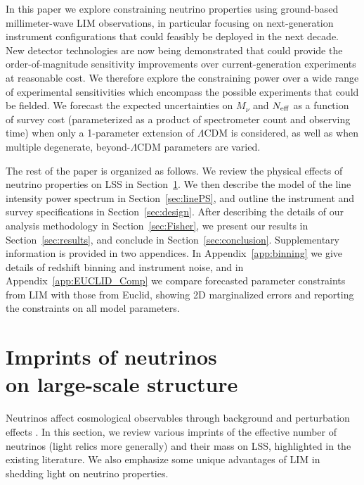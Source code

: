 \documentclass[twocolumn]{aastex631}
\begin{document}
In this paper we explore constraining neutrino properties using ground-based millimeter-wave LIM observations, in particular focusing on next-generation instrument configurations that could feasibly be deployed in the next decade.  New detector technologies are now being demonstrated that could provide the order-of-magnitude sensitivity improvements over current-generation experiments at reasonable cost.  We therefore explore the constraining power over a wide range of experimental sensitivities which encompass the possible experiments that could be fielded.  We forecast the expected uncertainties on $M_\nu$ and $N_{\rm eff}$ as a function of survey cost (parameterized as a product of spectrometer count and observing time) when only a 1-parameter extension of $\Lambda$CDM is considered, as well as when multiple degenerate, beyond-$\Lambda$CDM parameters are varied.

The rest of the paper is organized as follows. We review the physical effects of neutrino properties on LSS in Section~\ref{sec:rev}. We then describe the model of the line intensity power spectrum in Section~\ref{sec:linePS}, and outline the instrument and survey specifications in Section~\ref{sec:design}. After describing the details of our analysis methodology in Section~\ref{sec:Fisher}, we present our results in Section~\ref{sec:results}, and conclude in Section~\ref{sec:conclusion}. Supplementary information is provided in two appendices. In Appendix~\ref{app:binning} we give details of redshift binning and instrument noise, and in Appendix~\ref{app:EUCLID_Comp} we compare forecasted parameter constraints from LIM with those from Euclid, showing 2D marginalized errors and reporting the constraints on all model parameters. \vspace{-.05in} \\


\section{Imprints of neutrinos \\ on large-scale structure}\label{sec:rev}

Neutrinos affect cosmological observables through background and perturbation effects \citep{Lesgourgues:2018ncw}. In this section, we review various imprints of the effective number of neutrinos (light relics more generally) and their mass on LSS, highlighted in the existing literature. We also emphasize some unique advantages of LIM in shedding light on neutrino properties.
\end{document}
